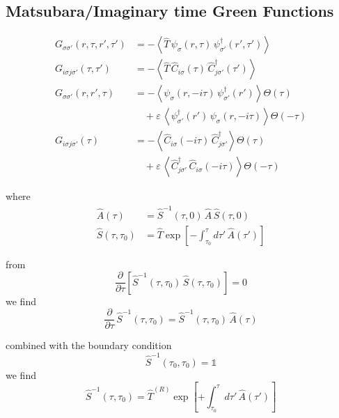 \subsection*{Matsubara/Imaginary time Green Functions}
\begin{align}
    G_{\sigma\sigma'}(r,\tau,r',\tau') &= -\left\langle \hat{T}\, \psi_{\sigma}(r,\tau)\, \psi_{\sigma'}^{\dagger}(r',\tau') \right\rangle \\[1ex]
    G_{i\sigma j\sigma'}(\tau,\tau') &= -\left\langle \hat{T}\, \hat{C}_{i\sigma}(\tau)\, \hat{C}_{j\sigma'}^{\dagger}(\tau') \right\rangle \\
    G_{\sigma\sigma'}(r,r',\tau) &= -\left\langle \psi_{\sigma}(r,-i\tau)\, \psi_{\sigma'}^{\dagger}(r') \right\rangle \Theta(\tau) \nonumber\\
    &\quad + \varepsilon\, \left\langle \psi_{\sigma'}^{\dagger}(r')\, \psi_{\sigma}(r,-i\tau) \right\rangle \Theta(-\tau) \\[2ex]
    G_{i\sigma j\sigma'}(\tau) &= -\left\langle \hat{C}_{i\sigma}(-i\tau)\, \hat{C}_{j\sigma'}^{\dagger} \right\rangle \Theta(\tau)\nonumber \\
    &\quad + \varepsilon\, \left\langle \hat{C}_{j\sigma'}^{\dagger}\, \hat{C}_{i\sigma}(-i\tau) \right\rangle \Theta(-\tau) \label{eq:imag-time-green-tti}
\end{align}

where
\begin{align*}
    \hat{A}(\tau) &= \hat{S}^{-1}(\tau,0)\, \hat{A}\, \hat{S}(\tau,0) \\[1ex]
    \hat{S}(\tau,\tau_0) &= \hat{T} \exp\left[ -\int_{\tau_0}^{\tau} d\tau'\, \hat{A}(\tau') \right]
\end{align*}

from
\begin{equation*}
    \frac{\partial}{\partial \tau} \left[ \hat{S}^{-1}(\tau,\tau_0)\, \hat{S}(\tau,\tau_0) \right] = 0
\end{equation*}
we find
\begin{equation*}
    \frac{\partial}{\partial \tau}\, \hat{S}^{-1}(\tau,\tau_0) = \hat{S}^{-1}(\tau,\tau_0)\, \hat{A}(\tau)
\end{equation*}

combined with the boundary condition
\begin{equation*}
    \hat{S}^{-1}(\tau_0,\tau_0) = \mathbb{1}
\end{equation*}
we find
\begin{equation*}
    \hat{S}^{-1}(\tau,\tau_0) = \hat{T}^{(R)} \exp\left[ +\int_{\tau_0}^{\tau} d\tau'\, \hat{A}(\tau') \right]
\end{equation*}

